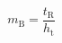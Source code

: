 \begin{equation}
\label{eqn:somelabel}
m_{\mathrm{B}}\mathrm{=}\frac{t_{\mathrm{R}}}{h_{\mathrm{t}}}
\end{equation}